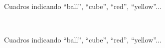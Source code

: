 \begin{figure}[ht]
\begin{center}
\\[0pt]
\caption{Cuadros indicando ``ball'', ``cube'', ``red'', ``yellow''...}
\label{fig-modelo16}
\end{center}
\end{figure}

\begin{figure}[ht]
\begin{center}
\\[0pt]
\caption{Cuadros indicando ``ball'', ``cube'', ``red'', ``yellow''...}
\label{fig-modelo17}
\end{center}
\end{figure}

